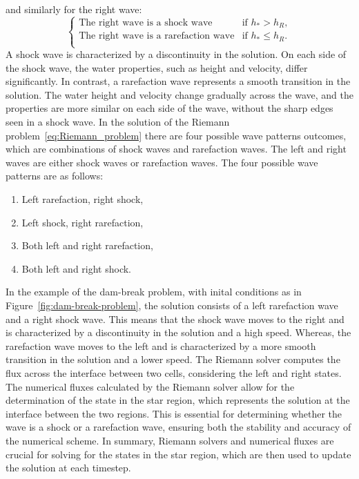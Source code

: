 and similarly for the right wave:
\begin{equation*}
    \begin{cases}
        \text{The right wave is a shock wave} & \text{if } h_* > h_R, \\
        \text{The right wave is a rarefaction wave} & \text{if } h_* \leq h_R. \\        
    \end{cases} 
\end{equation*}
A shock wave is characterized by a discontinuity in the solution.
On each side of the shock wave, the water properties, such as height and velocity, differ significantly.
In contrast, a rarefaction wave represents a smooth transition in the solution.
The water height and velocity change gradually across the wave, and the properties are more similar on each side of the wave, without the sharp edges seen in a shock wave.
In the solution of the Riemann problem~\eqref{eq:Riemann_problem} there are four possible wave patterns outcomes, which are combinations of shock waves and rarefaction waves.
The left and right waves are either shock waves or rarefaction waves.
The four possible wave patterns are as follows:
\begin{enumerate}[label= (\alph*)]
    \item Left rarefaction, right shock,
    \item Left shock, right rarefaction,
    \item Both left and right rarefaction,
    \item Both left and right shock.
\end{enumerate}
In the example of the dam-break problem, with inital conditions as in Figure~\ref{fig:dam-break-problem}, the solution consists of a left rarefaction wave and a right shock wave.
This means that the shock wave moves to the right and is characterized by a discontinuity in the solution and a high speed.
Whereas, the rarefaction wave moves to the left and is characterized by a more smooth transition in the solution and a lower speed.
The Riemann solver computes the flux across the interface between two cells, considering the left and right states.
The numerical fluxes calculated by the Riemann solver allow for the determination of the state in the star region, which represents the solution at the interface between the two regions.
This is essential for determining whether the wave is a shock or a rarefaction wave, ensuring both the stability and accuracy of the numerical scheme.
In summary, Riemann solvers and numerical fluxes are crucial for solving for the states in the star region, which are then used to update the solution at each timestep.

